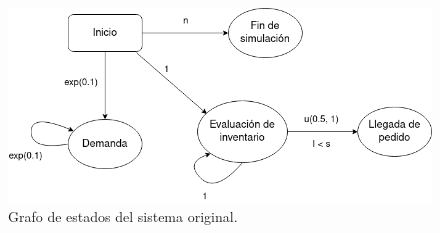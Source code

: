 \documentclass[12pt, spanish]{article}
\begin{document}
\begin{figure}[H]
  \centering
   \includegraphics[width=\textwidth]{grafo_sucesos_original.png}
	\caption{Grafo de estados del sistema original.}
\end{figure}
\end{document}
